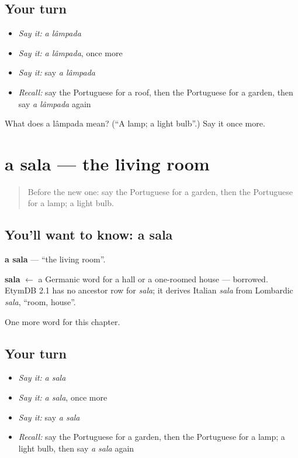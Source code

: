 \subsection*{Your turn}
\begin{itemize}
\raggedright
  \item \emph{Say it:} \emph{a lâmpada}
  \item \emph{Say it:} \emph{a lâmpada}, once more
  \item \emph{Say it:} say \emph{a lâmpada}
  \item \emph{Recall:} say the Portuguese for a roof, then the Portuguese for a garden, then say \emph{a lâmpada} again
\end{itemize}

\begin{tcolorbox}[breakable,colback=teal!4,colframe=teal!35!black,title={Before you move on}]
What does a lâmpada mean? (\textquotedblleft{}A lamp; a light bulb\textquotedblright{}.) Say it once more.
\end{tcolorbox}
\section[a sala]{a sala — the living room}

\label{lesson:PT-C50-sala}



\begin{quote}
Before the new one: say the Portuguese for a garden, then the Portuguese for a lamp; a light bulb.
\end{quote}

\subsection*{You'll want to know: a sala}
\textbf{a sala} — \textquotedblleft{}the living room\textquotedblright{}.

\begin{cousinweb}
\textbf{sala} $\leftarrow$ a Germanic word for a hall or a one-roomed house — borrowed. EtymDB 2.1 has no ancestor row for \emph{sala}; it derives Italian \emph{sala} from Lombardic \emph{sala}, \textquotedblleft{}room, house\textquotedblright{}.
\end{cousinweb}

\begin{grammarlens}[title={What you've built}]
One more word for this chapter.
\end{grammarlens}

\subsection*{Your turn}
\begin{itemize}
\raggedright
  \item \emph{Say it:} \emph{a sala}
  \item \emph{Say it:} \emph{a sala}, once more
  \item \emph{Say it:} say \emph{a sala}
  \item \emph{Recall:} say the Portuguese for a garden, then the Portuguese for a lamp; a light bulb, then say \emph{a sala} again
\end{itemize}

